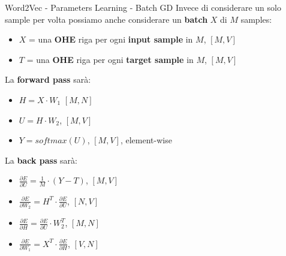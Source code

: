 \documentclass[british]{beamer}
\begin{document}
\begin{frame}{Word2Vec - Parameters Learning - Batch GD}
	Invece di considerare un solo sample per volta possiamo anche considerare un \textbf{batch} \(X\) di \(M\) samples:
	\begin{itemize}
		\item \(X\) = una \textbf{OHE} riga per ogni \textbf{input sample} in \(M\), \([M,V]\)
		\item \(T\) = una \textbf{OHE} riga per ogni \textbf{target sample} in \(M\), \([M,V]\)
	\end{itemize}
	La \textbf{forward pass} sar\`{a}:
	\begin{itemize}
		\item \(H = X \cdot W_1\)  \([M,N]\)
		\item \(U = H \cdot W_2\),  \([M,V]\)
		\item \(Y = softmax(U)\),  \([M,V]\), element-wise
	\end{itemize}
	La \textbf{back pass} sar\`{a}:
	\begin{itemize}
		\item \( \frac{\partial E}{\partial U} = \frac{1}{M} \cdot \left( Y - T \right) \), \([M,V]\)
		\item \( \frac{\partial E}{\partial W_2} = H^T \cdot\frac{\partial E}{\partial U} \), \([N,V]\)
		\item \(\frac{\partial E}{\partial H} = \frac{\partial E}{\partial U} \cdot W_2^T \), \([M,N]\)
		\item \(\frac{\partial E}{\partial W_1} = X^T \cdot \frac{\partial E}{\partial H}\), \([V,N]\)
	\end{itemize}
\end{frame}
\end{document}
